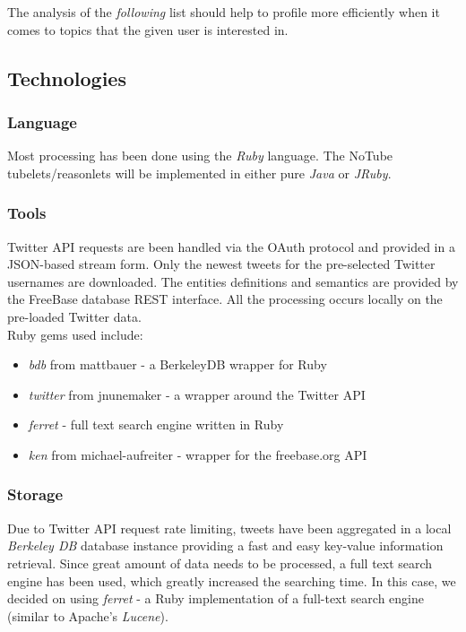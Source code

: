 \documentclass{article}
\begin{document}
The analysis of the \textit{following} list should help to profile more efficiently when it comes to topics that the given user is interested in.

\subsection{Technologies}
\subsubsection{Language}
Most processing has been done using the \textit{Ruby} language. The NoTube tubelets/reasonlets will be implemented in either pure \textit{Java} or \textit{JRuby}.
\subsubsection{Tools}
Twitter API requests are been handled via the OAuth protocol and provided in a JSON-based stream form. Only the newest tweets for the pre-selected Twitter usernames are downloaded. The entities definitions and semantics are provided by the FreeBase database REST interface. All the processing occurs locally on the pre-loaded Twitter data. \\ Ruby gems used include:
\begin{itemize}
  \item \textit{bdb} from mattbauer - a BerkeleyDB wrapper for Ruby
  \item \textit{twitter} from jnunemaker - a wrapper around the Twitter API
  \item \textit{ferret} - full text search engine written in Ruby
  \item \textit{ken} from michael-aufreiter - wrapper for the freebase.org API
\end{itemize}
\subsubsection{Storage}
Due to Twitter API request rate limiting, tweets have been aggregated in a local
\textit{Berkeley DB} database instance providing a fast and easy key-value
information retrieval. Since great amount of data needs to be processed, a full
text search engine has been used, which greatly increased the searching time. In
this case, we decided on using \textit{ferret} - a Ruby implementation of a
full-text search engine (similar to Apache's \textit{Lucene}).
\end{document}
